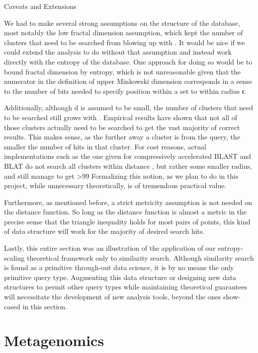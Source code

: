 \documentclass{amsbook}
\theoremstyle{definition}
\theoremstyle{remark}
\numberwithin{equation}{section}
\begin{document}
Caveats and Extensions

We had to make several strong assumptions on the structure of the database, most notably the low fractal dimension assumption, which kept the number of clusters that need to be searched from blowing up with .
It would be nice if we could extend the analysis to do without that assumption and instead work directly with the entropy of the database.
One approach for doing so would be to bound fractal dimension by entropy, which is not unreasonable given that the numerator in the definition of upper Minkowski dimension corresponds in a sense to the number of bits needed to specify position within a set to within radius ϵ.

Additionally, although d is assumed to be small, the number of clusters that need to be searched still grows with .
Empirical results have shown that not all of those clusters actually need to be searched to get the vast majority of correct results.
This makes sense, as the further away a cluster is from the query, the smaller the number of hits in that cluster.
For cost reasons, actual implementations such as the one given for compressively accelerated BLAST and BLAT do not search all clusters within distance , but rather some smaller radius, and still manage to get >99%
Formalizing this notion, as we plan to do in this project, while unnecessary theoretically, is of tremendous practical value.

Furthermore, as mentioned before, a strict metricity assumption is not needed on the distance function.
So long as the distance function is almost a metric in the precise sense that the triangle inequality holds for most pairs of points, this kind of data structure will work for the majority of desired search hits.

Lastly, this entire section was an illustration of the application of our entropy-scaling theoretical framework only to similarity search.
Although similarity search is found as a primitive through-out data science, it is by no means the only primitive query type.
Augmenting this data structure or designing new data structures to permit other query types while maintaining theoretical guarantees will necessitate the development of new analysis tools, beyond the ones show-cased in this section.

\section*{Metagenomics}
\end{document}
